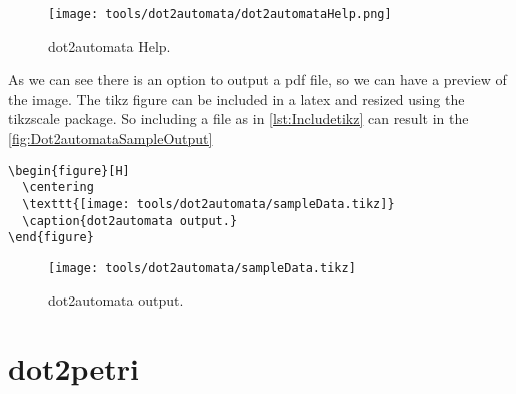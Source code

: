 \begin{figure}[H]
  \centering
  \texttt{[image: tools/dot2automata/dot2automataHelp.png]}
  \caption{dot2automata Help.}
  \label{fig:dot2automataHelp}
\end{figure}

As we can see there is an option to output a pdf file, so we can have a preview
of the image. The tikz figure can be included in a latex and resized using the
tikzscale package. So including a file as in \autoref{lst:Includetikz} can
result in the \autoref{fig:Dot2automataSampleOutput}

\begin{lstlisting}[caption=Include tikz file.,label={lst:Includetikz},numbers=none]
\begin{figure}[H]
  \centering
  \texttt{[image: tools/dot2automata/sampleData.tikz]}
  \caption{dot2automata output.}
\end{figure}
\end{lstlisting}


\begin{figure}[H]
  \centering
  \texttt{[image: tools/dot2automata/sampleData.tikz]}
  \caption{dot2automata output.}
  \label{fig:Dot2automataSampleOutput}
\end{figure}


% 

% 

% 

% 

% 

% 

% 

% 

\section{dot2petri}
\label{sec:dot2petri}

